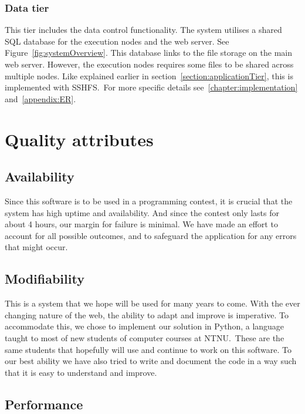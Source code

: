 \subsubsection{Data tier}

This tier includes the data control functionality. The system utilises a
shared SQL database for the execution nodes and the web server. See
Figure~\ref{fig:systemOverview}. This database links to the file storage on the main web
server. However, the execution nodes requires some files to be shared
across multiple nodes. Like explained earlier in
section~\ref{section:applicationTier}, this is implemented with SSHFS.\ For
more specific details see~\ref{chapter:implementation} and~\ref{appendix:ER}.


\section{Quality attributes}

\subsection{Availability}

Since this software is to be used in a programming contest, it is
crucial that the system has high uptime and availability. And since the
contest only lasts for about 4 hours, our margin for failure is
minimal. We have made an effort to account for all possible outcomes,
and to safeguard the application for any errors that might occur. 

\subsection{Modifiability}

This is a system that we hope will be used for many years to come. With
the ever changing nature of the web, the ability to adapt and improve
is imperative. To accommodate this, we chose to implement our solution
in Python, a language taught to most of new students of computer
courses at NTNU.\ These are the same students that hopefully will use
and continue to work on this software. To our best ability we have also
tried to write and document the code in a way such that it is easy to
understand and improve.

\subsection{Performance}

